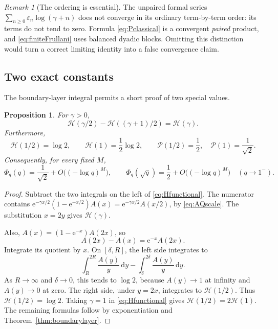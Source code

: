 \documentclass[11pt,oneside]{article}
\numberwithin{equation}{section}
\newtheorem{proposition}[theorem]{Proposition}
\theoremstyle{definition}
\theoremstyle{remark}
\newtheorem{remark}[theorem]{Remark}
\newcommand{\eps}{\varepsilon}
\newcommand{\dd}{\,\mathrm d}
\newcommand{\e}{\mathrm e}
\begin{document}
\begin{remark}[The ordering is essential]
The unpaired formal series
\(\sum_{n\ge0}\eps_n\log(\gamma+n)\) does not converge in its ordinary
term-by-term order: its terms do not tend to zero. Formula
\eqref{eq:Pclassical} is a convergent \emph{paired} product, and
\eqref{eq:finiteFrullani} uses balanced dyadic blocks. Omitting this distinction
would turn a correct limiting identity into a false convergence claim.
\end{remark}

\subsection{Two exact constants}
The boundary-layer integral permits a short proof of two special values.

\begin{proposition}
\label{prop:constants}
For \(\gamma>0\),
\begin{equation}
 \mathcal H(\gamma/2)-\mathcal H((\gamma+1)/2)=\mathcal H(\gamma).
 \label{eq:Hfunctional}
\end{equation}
Furthermore,
\begin{equation}
 \mathcal H(1/2)=\log2,\qquad \mathcal H(1)=\frac12\log2,
 \qquad \mathcal P(1/2)=\frac12,\quad\mathcal P(1)=\frac1{\sqrt2}.
 \label{eq:Hconstants}
\end{equation}
Consequently, for every fixed \(M\),
\begin{equation}
 \Phi_q(q)=\frac1{\sqrt2}+O\bigl((-\log q)^M\bigr),\qquad
 \Phi_q(\sqrt q)=\frac12+O\bigl((-\log q)^M\bigr)
 \quad(q\to1^-).
 \label{eq:diagonalconstants}
\end{equation}
\end{proposition}
\begin{proof}
Subtract the two integrals on the left of \eqref{eq:Hfunctional}.
The numerator contains
\(\e^{-\gamma x/2}(1-\e^{-x/2})A(x)
 =\e^{-\gamma x/2}A(x/2)\), by \eqref{eq:AQscale}.
The substitution \(x=2y\) gives \(\mathcal H(\gamma)\).

Also, \(A(x)=(1-\e^{-x})A(2x)\), so
\[
 A(2x)-A(x)=\e^{-x}A(2x).
\]
Integrate its quotient by \(x\). On \([\delta,R]\), the left side integrates
to
\[
 \int_R^{2R}\frac{A(y)}y\dd y-
 \int_\delta^{2\delta}\frac{A(y)}y\dd y.
\]
As \(R\to\infty\) and \(\delta\to0\), this tends to \(\log2\), because
\(A(y)\to1\) at infinity and \(A(y)\to0\) at zero. The right side, under
\(y=2x\), integrates to \(\mathcal H(1/2)\). Thus
\(\mathcal H(1/2)=\log2\). Taking \(\gamma=1\) in
\eqref{eq:Hfunctional} gives \(\mathcal H(1/2)=2\mathcal H(1)\).
The remaining formulas follow by exponentiation and
Theorem~\ref{thm:boundarylayer}.
\end{proof}
\end{document}
